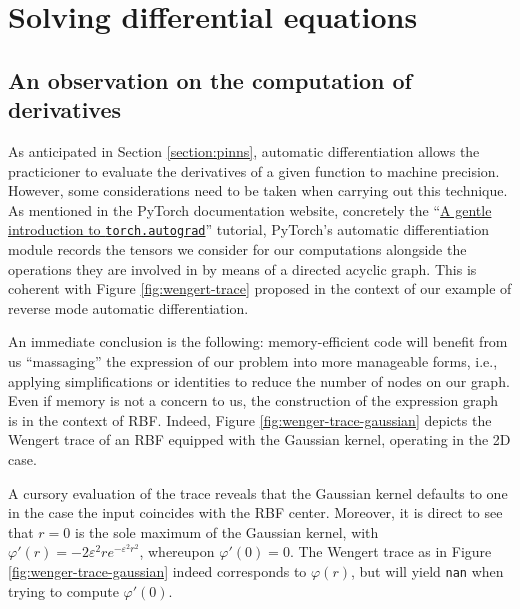 \documentclass[12pt]{report} %
\begin{document}
\section{Solving differential equations}

\subsection{An observation on the computation of derivatives}

As anticipated in Section \ref{section:pinns}, automatic differentiation allows the
practicioner to evaluate the derivatives of a given function to machine precision.
However, some considerations need to be taken when carrying out this technique.
As mentioned in the PyTorch documentation website, concretely the 
``\href{https://pytorch.org/tutorials/beginner/blitz/autograd_tutorial.html}{A gentle
introduction to \texttt{torch.autograd}}'' tutorial, PyTorch's automatic differentiation
module records the tensors we consider for our computations alongside the operations 
they are involved in by means of a directed acyclic graph. This is coherent with
Figure \ref{fig:wengert-trace} proposed in the context of our example of reverse 
mode automatic differentiation.

An immediate conclusion is the following: memory-efficient code will benefit from us
``massaging'' the expression of our problem into more manageable forms, i.e., applying
simplifications or identities to reduce the number of nodes on our graph. 
Even if memory is not a concern to us, the construction of the expression graph is 
in the context of RBF. Indeed, Figure \ref{fig:wenger-trace-gaussian} 
depicts the Wengert trace of an RBF equipped with the Gaussian kernel, operating in the 2D
case.

A cursory evaluation of the trace reveals that the Gaussian kernel defaults to one in
the case the input coincides with the RBF center. Moreover, it is direct to see that  
$r=0$ is the sole maximum of the Gaussian kernel, with $\varphi'(r)=-2 \varepsilon^2 r
e^{-\varepsilon^2 r^2}$, whereupon $\varphi'(0)=0$. The Wengert trace as in Figure \ref{fig:wenger-trace-gaussian} 
indeed corresponds to $\varphi(r)$, but will yield \texttt{nan} when trying to compute 
$\varphi'(0)$.
\end{document}
